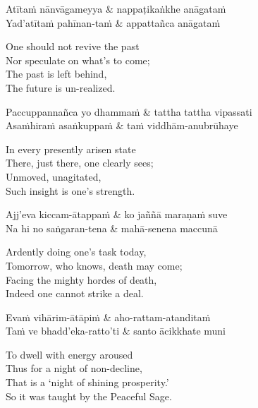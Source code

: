 \begin{twochants}
  Atītaṁ nānvāgameyya & nappaṭikaṅkhe anāgataṁ \\
  Yad'atītaṁ pahīnan-taṁ & appattañca anāgataṁ \\
\end{twochants}

\begin{english}
  One should not revive the past\\
  Nor speculate on what's to come;\\
  The past is left behind,\\
  The future is un-realized.
\end{english}

\begin{twochants}
  Paccuppannañca yo dhammaṁ & tattha tattha vipassati \\
  Asaṁhiraṁ asaṅkuppaṁ & taṁ viddhām-anubrūhaye \\
\end{twochants}

\begin{english}
  In every presently arisen state\\
  There, just there, one clearly sees;\\
  Unmoved, unagitated,\\
  Such insight is one's strength.
\end{english}

\begin{twochants}
  Ajj'eva kiccam-ātappaṁ & ko jaññā maraṇaṁ suve \\
  Na hi no saṅgaran-tena & mahā-senena maccunā \\
\end{twochants}

\begin{english}
  Ardently doing one's task today,\\
  Tomorrow, who knows, death may come;\\
  Facing the mighty hordes of death,\\
  Indeed one cannot strike a deal.
\end{english}

\begin{twochants}
  Evaṁ vihārim-ātāpiṁ & aho-rattam-atanditaṁ \\
  Taṁ ve bhadd'eka-ratto'ti & santo ācikkhate muni \\
\end{twochants}

\begin{english}
  To dwell with energy aroused\\
  Thus for a night of non-decline,\\
  That is a `night of shining prosperity.'\\
  So it was taught by the Peaceful Sage.
\end{english}

